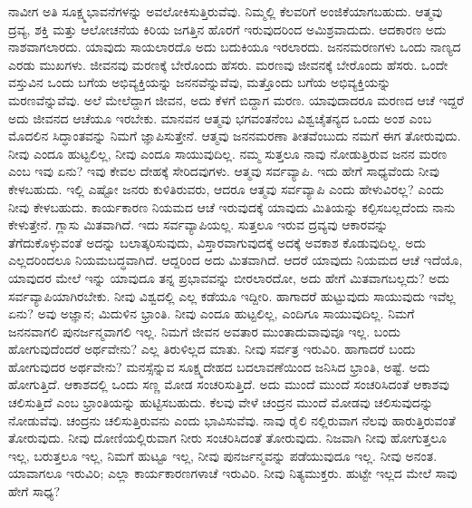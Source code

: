 ನಾವೀಗ ಅತಿ ಸೂಕ್ಷ್ಮಭಾವನೆಗಳನ್ನು ಅವಲೋಕಿಸುತ್ತಿರುವೆವು. ನಿಮ್ಮಲ್ಲಿ ಕೆಲವರಿಗೆ ಅಂಜಿಕೆಯಾಗಬಹುದು. ಆತ್ಮವು ದ್ರವ್ಯ, ಶಕ್ತಿ ಮತ್ತು ಆಲೋಚನೆಯ ಕಿರಿಯ ಜಗತ್ತಿನ ಹೊರಗೆ ಇರುವುದರಿಂದ ಅಮಿಶ್ರವಾದುದು. ಆದಕಾರಣ ಅದು ನಾಶವಾಗಲಾರದು. ಯಾವುದು ಸಾಯಲಾರದೊ ಅದು ಬದುಕಿಯೂ ಇರಲಾರದು. ಜನನಮರಣಗಳು ಒಂದು ನಾಣ್ಯದ ಎರಡು ಮುಖಗಳು. ಜೀವನವು ಮರಣಕ್ಕೆ ಬೇರೊಂದು ಹೆಸರು. ಮರಣವು ಜೀವನಕ್ಕೆ ಬೇರೊಂದು ಹೆಸರು. ಒಂದೇ ವಸ್ತುವಿನ ಒಂದು ಬಗೆಯ ಅಭಿವ್ಯಕ್ತಿಯನ್ನು ಜನನವೆನ್ನುವೆವು, ಮತ್ತೊಂದು ಬಗೆಯ ಅಭಿವ್ಯಕ್ತಿಯನ್ನು ಮರಣವೆನ್ನುವೆವು. ಅಲೆ ಮೇಲೆದ್ದಾಗ ಜೀವನ, ಅದು ಕೆಳಗೆ ಬಿದ್ದಾಗ ಮರಣ. ಯಾವುದಾದರೂ ಮರಣದ ಆಚೆ ಇದ್ದರೆ ಅದು ಜೀವನದ ಆಚೆಯೂ ಇರಬೇಕು. ಮಾನವನ ಆತ್ಮವು ಭಗವಂತನೆಂಬ ವಿಶ್ವಚೈತನ್ಯದ ಒಂದು ಅಂಶ ಎಂಬ ಮೊದಲಿನ ಸಿದ್ಧಾಂತವನ್ನು ನಿಮಗೆ ಜ್ಞಾಪಿಸುತ್ತೇನೆ. ಆತ್ಮವು ಜನನಮರಣಾ ತೀತವೆಂಬುದು ನಮಗೆ ಈಗ ತೋರುವುದು. ನೀವು ಎಂದೂ ಹುಟ್ಟಲಿಲ್ಲ, ನೀವು ಎಂದೂ ಸಾಯುವುದಿಲ್ಲ. ನಮ್ಮ ಸುತ್ತಲೂ ನಾವು ನೋಡುತ್ತಿರುವ ಜನನ ಮರಣ ಎಂಬ ಇವು ಏನು? ಇವು ಕೇವಲ ದೇಹಕ್ಕೆ ಸೇರಿದವುಗಳು. ಆತ್ಮವು ಸರ್ವವ್ಯಾಪಿ. ಇದು ಹೇಗೆ ಸಾಧ್ಯವೆಂದು ನೀವು ಕೇಳಬಹುದು. ಇಲ್ಲಿ ಎಷ್ಟೋ ಜನರು ಕುಳಿತಿರುವರು, ಆದರೂ ಆತ್ಮವು ಸರ್ವವ್ಯಾಪಿ ಎಂದು ಹೇಳುವಿರಲ್ಲ? ಎಂದು ನೀವು ಕೇಳಬಹುದು. ಕಾರ್ಯಕಾರಣ ನಿಯಮದ ಆಚೆ ಇರುವುದಕ್ಕೆ ಯಾವುದು ಮಿತಿಯನ್ನು ಕಲ್ಪಿಸಬಲ್ಲದೆಂದು ನಾನು ಕೇಳುತ್ತೇನೆ. ಗ್ಲಾಸು ಮಿತವಾಗಿದೆ. ಇದು ಸರ್ವವ್ಯಾಪಿಯಲ್ಲ. ಸುತ್ತಲೂ ಇರುವ ದ್ರವ್ಯವು ಆಕಾರವನ್ನು ತೆಗೆದುಕೊಳ್ಳುವಂತೆ ಅದನ್ನು ಬಲಾತ್ಕರಿಸುವುದು, ವಿಸ್ತಾರವಾಗುವುದಕ್ಕೆ ಅದಕ್ಕೆ ಅವಕಾಶ ಕೊಡುವುದಿಲ್ಲ. ಅದು ಎಲ್ಲದರಿಂದಲೂ ನಿಯಮಬದ್ಧವಾಗಿದೆ. ಆದ್ದರಿಂದ ಅದು ಮಿತವಾಗಿದೆ. ಆದರೆ ಯಾವುದು ನಿಯಮದ ಆಚೆ ಇದೆಯೊ, ಯಾವುದರ ಮೇಲೆ ಇನ್ನು ಯಾವುದೂ ತನ್ನ ಪ್ರಭಾವವನ್ನು ಬೀರಲಾರದೋ, ಅದು ಹೇಗೆ ಮಿತವಾಗಬಲ್ಲದು? ಅದು ಸರ್ವವ್ಯಾಪಿಯಾಗಿರಬೇಕು. ನೀವು ವಿಶ್ವದಲ್ಲಿ ಎಲ್ಲ ಕಡೆಯೂ ಇದ್ದೀರಿ. ಹಾಗಾದರೆ ಹುಟ್ಟುವುದು ಸಾಯುವುದು ಇವೆಲ್ಲ ಏನು? ಅವು ಅಜ್ಞಾನ; ಮಿದುಳಿನ ಭ್ರಾಂತಿ. ನೀವು ಎಂದೂ ಹುಟ್ಟಲಿಲ್ಲ, ಎಂದಿಗೂ ಸಾಯುವುದಿಲ್ಲ. ನಿಮಗೆ ಜನನವಾಗಲಿ ಪುನರ್ಜನ್ಮವಾಗಲಿ ಇಲ್ಲ. ನಿಮಗೆ ಜೀವನ ಅವತಾರ ಮುಂತಾದುವಾವುವೂ ಇಲ್ಲ. ಬಂದು ಹೋಗುವುದೆಂದರೆ ಅರ್ಥವೇನು? ಎಲ್ಲ ತಿರುಳಿಲ್ಲದ ಮಾತು. ನೀವು ಸರ್ವತ್ರ ಇರುವಿರಿ. ಹಾಗಾದರೆ ಬಂದು ಹೋಗುವುದರ ಅರ್ಥವೇನು? ಮನಸ್ಸೆನ್ನುವ ಸೂಕ್ಷ್ಮದೇಹದ ಬದಲಾವಣೆಯಿಂದ ಜನಿಸಿದ ಭ್ರಾಂತಿ, ಅಷ್ಟೆ. ಅದು ಹೋಗುತ್ತಿದೆ. ಆಕಾಶದಲ್ಲಿ ಒಂದು ಸಣ್ಣ ಮೋಡ ಸಂಚರಿಸುತ್ತಿದೆ. ಅದು ಮುಂದೆ ಮುಂದೆ ಸಂಚರಿಸಿದಂತೆ ಆಕಾಶವು ಚಲಿಸುತ್ತಿದೆ ಎಂಬ ಭ್ರಾಂತಿಯನ್ನು ಹುಟ್ಟಿಸಬಹುದು. ಕೆಲವು ವೇಳೆ ಚಂದ್ರನ ಮುಂದೆ ಮೋಡವು ಚಲಿಸುವುದನ್ನು ನೋಡುವೆವು. ಚಂದ್ರನು ಚಲಿಸುತ್ತಿರುವನು ಎಂದು ಭಾವಿಸುವೆವು. ನಾವು ರೈಲಿ ನಲ್ಲಿರುವಾಗ ನೆಲವು ಹಾರುತ್ತಿರುವಂತೆ ತೋರುವುದು. ನೀವು ದೋಣಿಯಲ್ಲಿರುವಾಗ ನೀರು ಸಂಚರಿಸಿದಂತೆ ತೋರುವುದು. ನಿಜವಾಗಿ ನೀವು ಹೋಗುತ್ತಲೂ ಇಲ್ಲ, ಬರುತ್ತಲೂ ಇಲ್ಲ, ನಿಮಗೆ ಹುಟ್ಟೂ ಇಲ್ಲ, ನೀವು ಪುನರ್ಜನ್ಮವನ್ನು ಪಡೆಯುವುದೂ ಇಲ್ಲ. ನೀವು ಅನಂತ. ಯಾವಾಗಲೂ ಇರುವಿರಿ; ಎಲ್ಲಾ ಕಾರ್ಯಕಾರಣಗಳಾಚೆ ಇರುವಿರಿ. ನೀವು ನಿತ್ಯಮುಕ್ತರು. ಹುಟ್ಟೇ ಇಲ್ಲದ ಮೇಲೆ ಸಾವು ಹೇಗೆ ಸಾಧ್ಯ?

